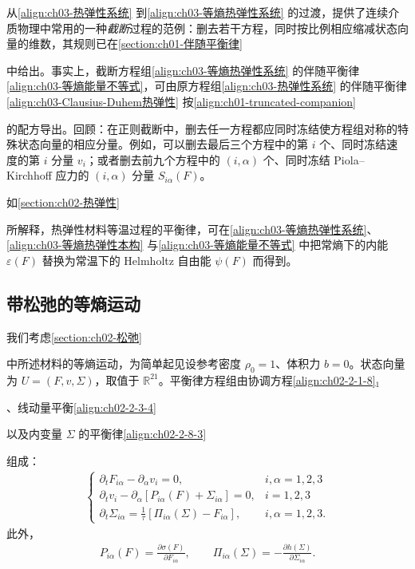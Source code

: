 ﻿\documentclass[../../main.tex]{subfiles}
\begin{document}
从\eqref{align:ch03-热弹性系统} 到\eqref{align:ch03-等熵热弹性系统} 的过渡，提供了连续介质物理中常用的一种\emph{截断}过程的范例：删去若干方程，同时按比例相应缩减状态向量的维数，其规则已在\cref{section:ch01-伴随平衡律}%

中给出。事实上，截断方程组\eqref{align:ch03-等熵热弹性系统} 的伴随平衡律\eqref{align:ch03-等熵能量不等式}，可由原方程组\eqref{align:ch03-热弹性系统} 的伴随平衡律\eqref{align:ch03-Clausius-Duhem热弹性} 按\eqref{align:ch01-truncated-companion}%

的配方导出。回顾：在正则截断中，删去任一方程都应同时冻结使方程组对称的特殊状态向量的相应分量。例如，可以删去最后三个方程中的第 $i$ 个、同时冻结速度的第 $i$ 分量 $v_{i}$；或者删去前九个方程中的 $(i,\alpha)$ 个、同时冻结 Piola--Kirchhoff 应力的 $(i,\alpha)$ 分量 $S_{i\alpha}(F)$。

如\cref{section:ch02-热弹性}%

所解释，热弹性材料等温过程的平衡律，可在\eqref{align:ch03-等熵热弹性系统}、\eqref{align:ch03-等熵热弹性本构} 与\eqref{align:ch03-等熵能量不等式} 中把常熵下的内能 $\varepsilon(F)$ 替换为常温下的 Helmholtz 自由能 $\psi(F)$ 而得到。

\subsection{带松弛的等熵运动}\label{subsection:ch03-带松弛等熵}

我们考虑\cref{section:ch02-松弛}%

中所述材料的等熵运动，为简单起见设参考密度 $\rho_{0}=1$、体积力 $b=0$。状态向量为 $U=(F,v,\Sigma)$，取值于 $\mathbb{R}^{21}$。平衡律方程组由协调方程\eqref{align:ch02-2-1-8}$_{1}$%

、线动量平衡\eqref{align:ch02-2-3-4}%

以及内变量 $\Sigma$ 的平衡律\eqref{align:ch02-2-8-3}%

组成：
\begin{align}
\begin{cases}
\partial_{t}F_{i\alpha}-\partial_{\alpha}v_{i}=0, & i,\alpha=1,2,3\\
\partial_{t}v_{i}-\partial_{\alpha}\left[P_{i\alpha}(F)+\Sigma_{i\alpha}\right]=0, & i=1,2,3\\
\partial_{t}\Sigma_{i\alpha}=\frac{1}{\tau}\left[\Pi_{i\alpha}(\Sigma)-F_{i\alpha}\right], & i,\alpha=1,2,3.
\end{cases}
\label{align:ch03-松弛系统}
\end{align}
此外，
\begin{align}
P_{i\alpha}(F)=\frac{\partial\sigma(F)}{\partial F_{i\alpha}},\qquad \Pi_{i\alpha}(\Sigma)=-\frac{\partial h(\Sigma)}{\partial\Sigma_{i\alpha}}.
\label{align:ch03-松弛本构}
\end{align}
\end{document}
